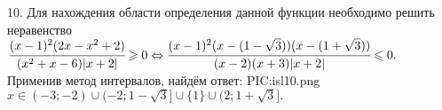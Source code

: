 10. Для нахождения области определения данной функции необходимо решить неравенство\\ $\cfrac{(x-1)^2(2x-x^2+2)}{(x^2+x-6)|x+2|}\geqslant0\Leftrightarrow
\cfrac{(x-1)^2(x-(1-\sqrt{3}))(x-(1+\sqrt{3}))}{(x-2)(x+3)|x+2|}\leqslant0.$ Применив метод интервалов, найдём ответ:
{{PIC:isl10.png}}
$x\in(-3;-2)\cup(-2;1-\sqrt{3}]\cup\{1\}\cup(2;1+\sqrt{3}].$\\
